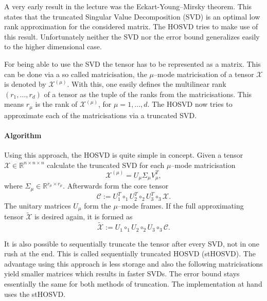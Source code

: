 \documentclass[%
a4paper,
parskip=half,
DIV=calc,
]
{scrartcl}
\begin{document}
A very early result in the lecture was the Eckart-Young--Mirsky
theorem. This states that the truncated Singular Value Decomposition
(SVD) is an optimal low rank approximation for the considered matrix.
The HOSVD tries to make use of this result. Unfortunately neither the
SVD nor the error bound generalizes easily to the higher dimensional
case.

For being able to use the SVD the tensor has to be represented as a
matrix.  This can be done via a so called matricisation, the
$\mu$--mode matricisation of a tensor $\mathcal{X}$ is denoted by
$\mathcal{X}^{(\mu)}$.  With this, one easily defines the multilinear
rank $(r_1, \ldots, r_d)$ of a tensor as the tuple of the ranks from
the matricisations.  This means $r_{\mu}$ is the rank of
$\mathcal{X}^{(\mu)}$, for $\mu = 1, \ldots, d$. The HOSVD now tries
to approximate each of the matricisations via a truncated
SVD.

\paragraph{Algorithm}

Using this approach, the HOSVD is quite simple in concept. Given a
tensor $\mathcal{X} \in \mathbb{R}^{n \times n \times n}$ calculate
the truncated SVD for each $\mu$--mode matricisation
\begin{equation*}
  \mathcal{X}^{(\mu)} = U_{\mu}\Sigma_{\mu}V_{\mu}^T ,
\end{equation*}
where $\Sigma_{\mu} \in \mathbb{R}^{r_\mu \times r_\mu}$. Afterwards form the core tensor
\begin{equation*}
  \mathcal{C} := U_1^T \circ_1 U_2^T \circ_2 U_3^T \circ_3 \mathcal{X}.
\end{equation*}
The unitary matrices $U_{\mu}$ form the $\mu$--mode frames. If the
full approximating tensor $\tilde{\mathcal{X}}$ is desired again, it is formed as
\begin{equation*}
  \tilde{\mathcal{X}} := U_1 \circ_1 U_2 \circ_2 U_3 \circ_3 \mathcal{C}.
\end{equation*}

It is also possible to sequentially truncate the tensor after every
SVD, not in one rush at the end.  This is called sequentially
truncated HOSVD (stHOSVD).  The advantage using this approach is less storage
and also the following matricisations yield smaller matrices which
results in faster SVDs.  The error bound stays essentially the same
for both methods of truncation.  The implementation at hand uses the
stHOSVD.
\end{document}
